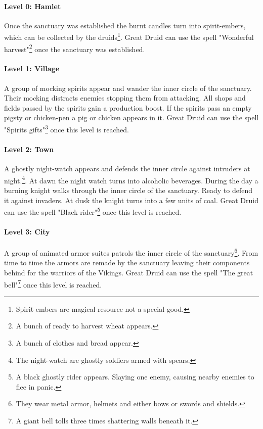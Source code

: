 \documentclass[a4paper]{article}
\begin{document}
			\paragraph{Level 0: Hamlet}
				Once the sanctuary was established the burnt candles turn into spirit-embers,
				which can be collected by the druids\footnote{
					Spirit embers are magical resource not a special good.
				}.
				Great Druid can use the spell "Wonderful harvest"\footnote{
					A bunch of ready to harvest wheat appears.
				} once the sanctuary was established.

			\paragraph{Level 1: Village}
				A group of mocking spirits appear and wander the inner circle of the sanctuary.
				Their mocking distracts enemies stopping them from attacking.
				All shops and fields passed by the spirits gain a production boost.
				If the spirits pass an empty pigsty or chicken-pen a pig or chicken appears in it.
				Great Druid can use the spell "Spirits gifts"\footnote{
					A bunch of clothes and bread appear.
				} once this level is reached.

			\paragraph{Level 2: Town}
				A ghostly night-watch appears and defends the inner circle against intruders at night.\footnote{
					The night-watch are ghostly soldiers armed with spears.
				}.
				At dawn the night watch turns into alcoholic beverages.
				During the day a burning knight walks through the inner circle of the sanctuary.
				Ready to defend it against invaders.
				At dusk the knight turns into a few units of coal. 
				Great Druid can use the spell "Black rider"\footnote{
					A black ghostly rider appears.
					Slaying one enemy, causing nearby enemies to flee in panic.
				} once this level is reached.

			\paragraph{Level 3: City}
				A group of animated armor suites patrols the inner circle of the sanctuary\footnote{
					They wear metal armor, helmets and either bows or swords and shields.
				}.
				From time to time the armors are remade by the sanctuary leaving their
				components behind for the warriors of the \gls{Vikings}.
				Great Druid can use the spell "The great bell"\footnote{
					A giant bell tolls three times shattering walls beneath it.
				} once this level is reached.
\end{document}
